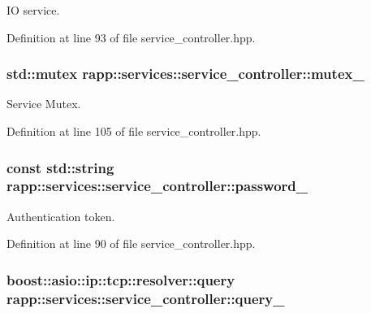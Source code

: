 I\-O service. 



Definition at line 93 of file service\-\_\-controller.\-hpp.

\hypertarget{classrapp_1_1services_1_1service__controller_aebff63a67dbf4e9ca76398ea96bd769a}{
\subsubsection[{mutex\-\_\-}]{\setlength{\rightskip}{0pt plus 5cm}std\-::mutex rapp\-::services\-::service\-\_\-controller\-::mutex\-\_\-\hspace{0.3cm}{\ttfamily [private]}}}\label{classrapp_1_1services_1_1service__controller_aebff63a67dbf4e9ca76398ea96bd769a}


Service Mutex. 



Definition at line 105 of file service\-\_\-controller.\-hpp.

\hypertarget{classrapp_1_1services_1_1service__controller_a7e10e406506cc0540c89eef268b64eca}{
\subsubsection[{password\-\_\-}]{\setlength{\rightskip}{0pt plus 5cm}const std\-::string rapp\-::services\-::service\-\_\-controller\-::password\-\_\-\hspace{0.3cm}{\ttfamily [private]}}}\label{classrapp_1_1services_1_1service__controller_a7e10e406506cc0540c89eef268b64eca}


Authentication token. 



Definition at line 90 of file service\-\_\-controller.\-hpp.

\hypertarget{classrapp_1_1services_1_1service__controller_adee18fff2cac5e4e95cf36ee20b568c0}{
\subsubsection[{query\-\_\-}]{\setlength{\rightskip}{0pt plus 5cm}boost\-::asio\-::ip\-::tcp\-::resolver\-::query rapp\-::services\-::service\-\_\-controller\-::query\-\_\-\hspace{0.3cm}{\ttfamily [private]}}}\label{classrapp_1_1services_1_1service__controller_adee18fff2cac5e4e95cf36ee20b568c0}


